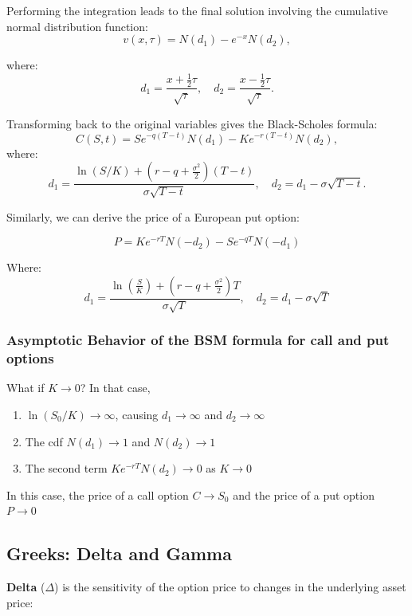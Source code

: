 \documentclass[
  letterpaper,
  DIV=11,
  numbers=noendperiod]{scrartcl}
\providecommand{\tightlist}{%
  \setlength{\itemsep}{0pt}\setlength{\parskip}{0pt}}
\begin{document}
Performing the integration leads to the final solution involving the
cumulative normal distribution function: \[
v(x, \tau) = N(d_1) - e^{-x} N(d_2),
\]

where: \[
d_1 = \frac{x + \frac{1}{2} \tau}{\sqrt{\tau}}, \quad d_2 = \frac{x - \frac{1}{2} \tau}{\sqrt{\tau}}.
\]

Transforming back to the original variables gives the Black-Scholes
formula: \[
C(S, t) = S e^{-q(T-t)} N(d_1) - K e^{-r(T-t)} N(d_2),
\] where: \[
d_1 = \frac{\ln(S / K) + (r - q + \frac{\sigma^2}{2})(T-t)}{\sigma \sqrt{T-t}}, \quad d_2 = d_1 - \sigma \sqrt{T-t}.
\]

Similarly, we can derive the price of a European put option:

\[
P = K e^{-rT} N(-d_2) - S e^{-qT} N(-d_1)
\]

Where: \[
d_1 = \frac{\ln(\frac{S}{K}) + (r - q + \frac{\sigma^2}{2})T}{\sigma \sqrt{T}}, \quad d_2 = d_1 - \sigma \sqrt{T}
\]

\subsubsection{Asymptotic Behavior of the BSM formula for call and put
options}\label{asymptotic-behavior-of-the-bsm-formula-for-call-and-put-options}

What if \(K\rightarrow 0\)? In that case,

\begin{enumerate}
\def\labelenumi{\arabic{enumi}.}
\tightlist
\item
  \(\ln(S_0/K)\rightarrow \infty\), causing \(d_1 \rightarrow \infty\)
  and \(d_2 \rightarrow \infty\)\\
\item
  The cdf \(N(d_1)\rightarrow 1\) and \(N(d_2)\rightarrow 1\)\\
\item
  The second term \(Ke^{-rT}N(d_2)\rightarrow 0\) as \(K\rightarrow 0\)
\end{enumerate}

In this case, the price of a call option \(C\rightarrow S_0\) and the
price of a put option \(P \rightarrow 0\)

\subsection{Greeks: Delta and Gamma}\label{greeks-delta-and-gamma}

\textbf{Delta} (\(\Delta\)) is the sensitivity of the option price to
changes in the underlying asset price:
\end{document}

